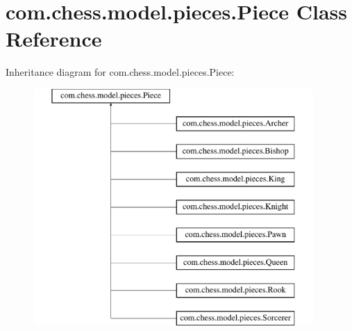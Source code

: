 \hypertarget{classcom_1_1chess_1_1model_1_1pieces_1_1_piece}{}\section{com.\+chess.\+model.\+pieces.\+Piece Class Reference}
\label{classcom_1_1chess_1_1model_1_1pieces_1_1_piece}
Inheritance diagram for com.\+chess.\+model.\+pieces.\+Piece\+:\begin{figure}[H]
\begin{center}
\leavevmode
\includegraphics[height=9.000000cm]{classcom_1_1chess_1_1model_1_1pieces_1_1_piece}
\end{center}
\end{figure}
